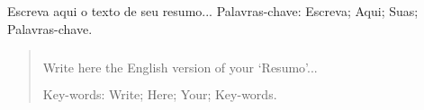 \begin{resumo}
Escreva aqui o texto de seu resumo...
Palavras-chave: Escreva; Aqui; Suas; Palavras-chave.
\end{resumo}

\begin{abstract}
$\phantom{linha em branco}$\\
Write here the English version of your `Resumo'...\\
$\phantom{linha em branco}$\\
Key-words: Write; Here; Your; Key-words.
\end{abstract}